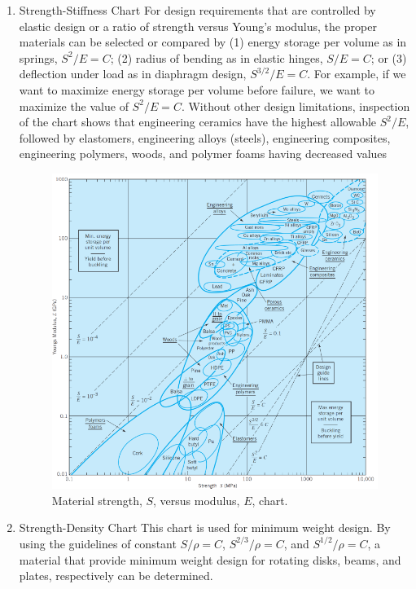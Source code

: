 \documentclass[a4paper,openany,nobib]{tufte-book}
\begin{document}
\begin{enumerate}
\item Strength-Stiffness Chart
\label{strength-stiffness-chart}
For design requirements that are controlled by elastic design or a ratio
of strength versus Young's modulus, the proper materials can be selected
or compared by (1) energy storage per volume as in springs, \(S^2/E = C\);
(2) radius of bending as in elastic hinges, \(S/E = C\); or (3) deflection
under load as in diaphragm design, \(S^{3/2}/E = C\). For example, if we
want to maximize energy storage per volume before failure, we want to
maximize the value of \(S^2/E = C\). Without other design limitations,
inspection of the chart shows that engineering ceramics have the highest
allowable \(S^2/E\), followed by elastomers, engineering alloys (steels),
engineering composites, engineering polymers, woods, and polymer foams
having decreased values


\begin{figure}[htbp]
\centering
\includegraphics[width=.9\linewidth]{pictures/Material-selection/strength-stiffness-diagram.png}
\caption{Material strength, \(S\), versus modulus, \(E\), chart. \cite{ashby2010materials}}
\end{figure}

\item Strength-Density Chart
\label{strength-density-chart}
This chart is used for minimum weight design. By using the guidelines of
constant \(S/\rho = C\), \(S^{2/3}/\rho = C\), and \(S^{1/2}/\rho = C\), a
material that provide minimum weight design for rotating disks, beams,
and plates, respectively can be determined.



\end{enumerate}
\end{document}

